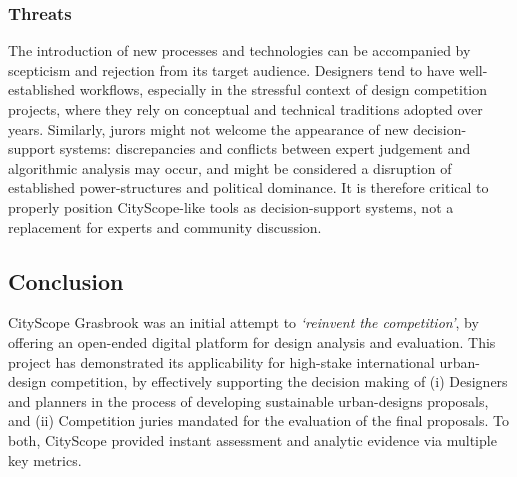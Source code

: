 {{        \subsubsection{Threats}
        {
            The introduction of new processes and technologies can be accompanied by scepticism and rejection from its target audience. Designers tend to have well-established workflows, especially in the stressful context of design competition projects, where they rely on conceptual and technical traditions adopted over years. Similarly, jurors might not welcome the appearance of new decision-support systems: discrepancies and conflicts between expert judgement and algorithmic analysis may occur, and might be considered a disruption of established power-structures and political dominance. It is therefore critical to properly position CityScope-like tools as decision-support systems, not a replacement for experts and community discussion.
        }

    }

    \subsection{Conclusion}
    {
        CityScope Grasbrook was an initial attempt to \textit{`reinvent the competition'}, by offering an open-ended digital platform for design analysis and evaluation. This project has demonstrated its applicability for high-stake international urban-design competition, by effectively supporting the decision making of (i) Designers and planners in the process of developing sustainable urban-designs proposals, and (ii) Competition juries mandated for the evaluation of the final proposals. To both, CityScope provided instant assessment and analytic evidence via multiple key metrics.
    }
}






















